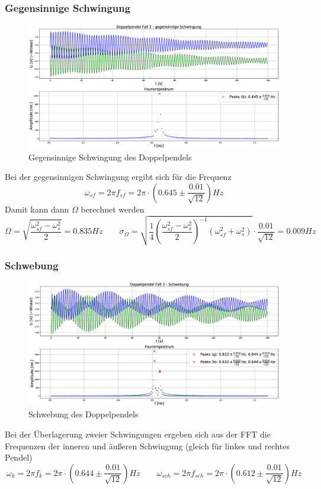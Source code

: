 \documentclass[a4paper, 11pt]{article}
\begin{document}
\subsubsection{Gegensinnige Schwingung}
\begin{figure}[H]
	\centering
	\includegraphics[scale=0.3]{Plots/Doppelpendel2.eps}
	\caption{Gegensinnige Schwingung des Doppelpendels}
	\label{pic:Doppelpendel2}
\end{figure}
Bei der gegensinnigen Schwingung ergibt sich für die Frequenz 
\begin{equation*}
\omega_{sf} = 2\pi f_{sf} = 2\pi \cdot \left( 0.645 \pm \frac{0.01}{\sqrt{12}} \right) Hz
\end{equation*}
Damit kann dann $\Omega$ berechnet werden
\begin{equation}
\Omega = \sqrt{\frac{\omega_{sf}^2-\omega_s^2}{2}} = 0.835 Hz \qquad \sigma_{\Omega} = \sqrt{ \frac{1}{4} \left(\frac{\omega_{sf}^2-\omega_s^2}{2}\right)^{-1} (\omega_{sf}^2+\omega_s^2) } \cdot \frac{0.01}{\sqrt{12}} = 0.009 Hz
\end{equation} 


\subsubsection{Schwebung}
\begin{figure}[H]
	\centering
	\includegraphics[scale=0.3]{Plots/Doppelpendel3.eps}
	\caption{Schwebung des Doppelpendels}
	\label{pic:Doppelpendel3}
\end{figure}
Bei der Überlagerung zweier Schwingungen ergeben sich aus der FFT die Frequenzen der inneren und äußeren Schwingung (gleich für linkes und rechtes Pendel)
\begin{equation*}
\omega_{k} = 2\pi f_k = 2\pi \cdot \left( 0.644 \pm \frac{0.01}{\sqrt{12}} \right) Hz  \qquad  \omega_{sch} = 2\pi f_{sch} = 2\pi \cdot \left( 0.612 \pm \frac{0.01}{\sqrt{12}} \right) Hz
\end{equation*}
\end{document}
